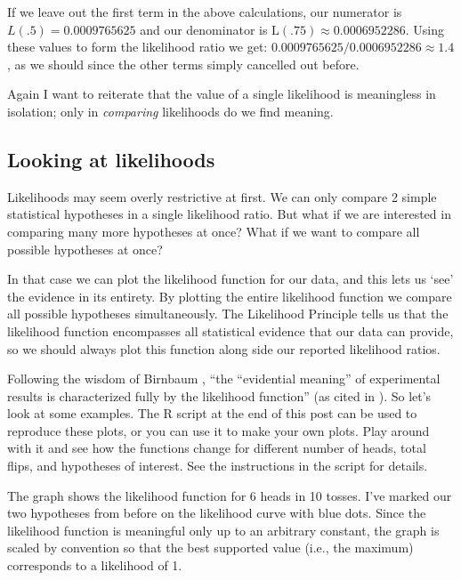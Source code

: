 If we leave out the first term in the above calculations, our numerator is $L(.5)=0.0009765625$
 and our denominator is $\mathrm{L}(.75) \approx 0.0006952286$. Using these values to form the likelihood ratio we get: $0.0009765625 / 0.0006952286 \approx 1.4$, as we should since the other terms simply cancelled out before.

Again I want to reiterate that the value of a single likelihood is meaningless in isolation; only in \textit{comparing} likelihoods do we find meaning.

\subsection{Looking at likelihoods}

Likelihoods may seem overly restrictive at first. We can only compare 2 simple statistical hypotheses in a single likelihood ratio. But what if we are interested in comparing many more hypotheses at once? What if we want to compare all possible hypotheses at once?

In that case we can plot the likelihood function for our data, and this lets us ‘see' the evidence in its entirety. By plotting the entire likelihood function we compare all possible hypotheses simultaneously. The Likelihood Principle tells us that the likelihood function encompasses all statistical evidence that our data can provide, so we should always plot this function along side our reported likelihood ratios.

Following the wisdom of Birnbaum \cite{Birnbaum1962}, ``the ``evidential meaning'' of experimental results is characterized fully by the likelihood function'' (as cited in \cite[p 25]{Royall2000}). So let's look at some examples. The R script at the end of this post can be used to reproduce these plots, or you can use it to make your own plots. Play around with it and see how the functions change for different number of heads, total flips, and hypotheses of interest. See the instructions in the script for details.

The graph shows the likelihood function for 6 heads in 10 tosses. I've marked our two hypotheses from before on the likelihood curve with blue dots. Since the likelihood function is meaningful only up to an arbitrary constant, the graph is scaled by convention so that the best supported value (i.e., the maximum) corresponds to a likelihood of 1.

